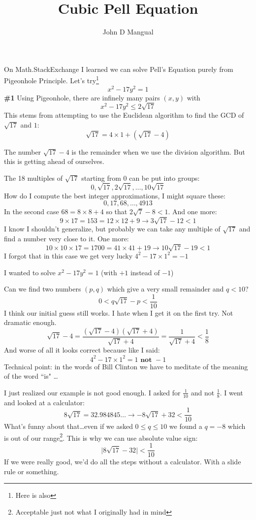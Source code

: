 \documentclass[12pt]{article}
\title{\textbf{ Cubic Pell Equation }}
\author{John D Mangual}
\date{}
\begin{document}
\selectfont \fontsize{25}{30}\selectfont

\maketitle

\noindent On Math.StackExchange I learned we can solve Pell's Equation purely from Pigeonhole Principle.  Let's try\footnote{Here is also }
$$ x^2 - 17 y^2 = 1 $$
\textbf{\#1} Using Pigeonhole, there are infinely many pairs $(x,y)$ with $$x^2 - 17y^2 \leq 2 \sqrt{17}$$
This stems from attempting to use the Euclidean algorithm to find the GCD of $\sqrt{17}$ and $1$:
$$  \sqrt{17} = 4 \times 1 + (\sqrt{17}-4) $$

\newpage

\noindent The number $\sqrt{17}-4$ is the remainder when we use the division algorithm.   But this is getting ahead of ourselves.  \newline

\noindent The 18 multiples of $\sqrt{17}$ starting from $0$ can be put into groups:
$$ 0, \sqrt{17}, 2\sqrt{17}, \dots , 10\sqrt{17} $$
How do I compute the best integer approximations, I might square these:
$$ 0, 17, 68, \dots, 4913 $$
In the second case $68 = 8\times 8 + 4$ so that $2 \sqrt{7} - 8 < 1$.  And one more:
$$ 9 \times 17 = 153 = 12 \times 12 + 9 \longrightarrow 3 \sqrt{17}-12 < 1 $$
I know I shouldn't generalize, but probably we can take any multiple of $\sqrt{17}$ and find a number very close to it.  One more:
$$ 10 \times 10 \times 17 = 
1700 = 41\times 41 + 19 \longrightarrow 10 \sqrt{17} - 19 < 1$$
I forgot that in this case we get very lucky $ 4^2 - 17 \times 1^2 = - 1$
\newpage

\noindent I wanted to solve $x^2 - 17 y^2 = 1$ (with $+1$ instead of $-1$) \newline

\noindent Can we find two numbers $(p,q)$ which give a very small remainder and $q < 10$?
$$ 0< q \sqrt{17}-p < \frac{1}{10} $$
I think our initial guess still works.  I hate when I get it on the first try.  Not dramatic enough.
$$ \sqrt{17}-4  = 
\frac{ (\sqrt{17}-4)(\sqrt{17}+4)}{\sqrt{17}+4} = \frac{1}{\sqrt{17}+4} < \frac{1}{8}$$
And worse of all it looks correct because like I said:
$$ 4^2 - 17 \times 1^2 = 1 \textbf{ not } -1$$
Technical point: in the words of Bill Clinton we have to meditate of the meaning of the word ``is" \dots

\newpage

\noindent I just realized our example is not good enough.  I asked for $\frac{1}{10}$ and not $\frac{1}{8}$.  I went and looked at a calculator:
$$  8 \sqrt{17} = 32.984845\dots \longrightarrow -8 \sqrt{17} + 32 < \frac{1}{10}$$
What's funny about that\dots even if we asked $0 \leq q \leq 10$ we found a $q = - 8$ which is out of our range\footnote{Acceptable just not what I originally had in mind}.  This is why we can use absolute value sign:
$$ \big| 8 \sqrt{17} - 32 \big| < \frac{1}{10} $$
If we were really good, we'd do all the steps without a calculator.  With a slide rule or something.  \newline
\end{document}
